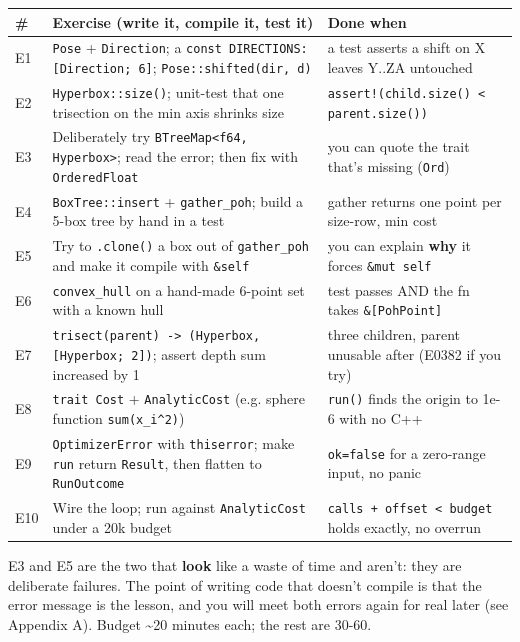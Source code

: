 \documentclass[11pt]{article}
\begin{document}
\begin{center}
\begin{tabular}{lll}
\# & Exercise (write it, compile it, test it) & Done when\\
\hline
E1 & \texttt{Pose} + \texttt{Direction}; a \texttt{const DIRECTIONS: [Direction; 6]}; \texttt{Pose::shifted(dir, d)} & a test asserts a shift on X leaves Y..ZA untouched\\
E2 & \texttt{Hyperbox::size()}; unit-test that one trisection on the min axis shrinks size & \texttt{assert!(child.size() < parent.size())}\\
E3 & Deliberately try \texttt{BTreeMap<f64, Hyperbox>}; read the error; then fix with \texttt{OrderedFloat} & you can quote the trait that's missing (\texttt{Ord})\\
E4 & \texttt{BoxTree::insert} + \texttt{gather\_poh}; build a 5-box tree by hand in a test & gather returns one point per size-row, min cost\\
E5 & Try to \texttt{.clone()} a box out of \texttt{gather\_poh} and make it compile with \texttt{\&self} & you can explain \textbf{why} it forces \texttt{\&mut self}\\
E6 & \texttt{convex\_hull} on a hand-made 6-point set with a known hull & test passes AND the fn takes \texttt{\&[PohPoint]}\\
E7 & \texttt{trisect(parent) -> (Hyperbox, [Hyperbox; 2])}; assert depth sum increased by 1 & three children, parent unusable after (E0382 if you try)\\
E8 & \texttt{trait Cost} + \texttt{AnalyticCost} (e.g. sphere function \texttt{sum(x\_i\textasciicircum{}2)}) & \texttt{run()} finds the origin to 1e-6 with no C++\\
E9 & \texttt{OptimizerError} with \texttt{thiserror}; make \texttt{run} return \texttt{Result}, then flatten to \texttt{RunOutcome} & \texttt{ok=false} for a zero-range input, no panic\\
E10 & Wire the loop; run against \texttt{AnalyticCost} under a 20k budget & \texttt{calls + offset < budget} holds exactly, no overrun\\
\end{tabular}
\end{center}

E3 and E5 are the two that \textbf{look} like a waste of time and aren't: they are
deliberate failures. The point of writing code that doesn't compile is that the
error message is the lesson, and you will meet both errors again for real later
(see Appendix A). Budget \textasciitilde{}20 minutes each; the rest are 30-60.
\end{document}
